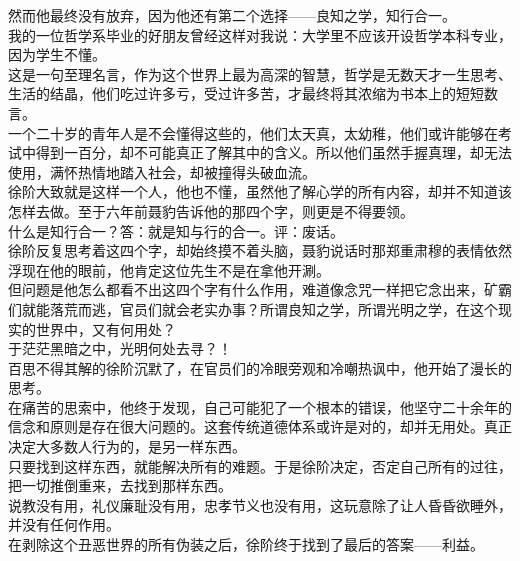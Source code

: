 \begin{multicols}{\theparacolNo}
然而他最终没有放弃，因为他还有第二个选择——良知之学，知行合一。\\

我的一位哲学系毕业的好朋友曾经这样对我说：大学里不应该开设哲学本科专业，因为学生不懂。\\

这是一句至理名言，作为这个世界上最为高深的智慧，哲学是无数天才一生思考、生活的结晶，他们吃过许多亏，受过许多苦，才最终将其浓缩为书本上的短短数言。\\

一个二十岁的青年人是不会懂得这些的，他们太天真，太幼稚，他们或许能够在考试中得到一百分，却不可能真正了解其中的含义。所以他们虽然手握真理，却无法使用，满怀热情地踏入社会，却被撞得头破血流。\\

徐阶大致就是这样一个人，他也不懂，虽然他了解心学的所有内容，却并不知道该怎样去做。至于六年前聂豹告诉他的那四个字，则更是不得要领。\\

什么是知行合一？答：就是知与行的合一。评：废话。\\

徐阶反复思考着这四个字，却始终摸不着头脑，聂豹说话时那郑重肃穆的表情依然浮现在他的眼前，他肯定这位先生不是在拿他开涮。\\

但问题是他怎么都看不出这四个字有什么作用，难道像念咒一样把它念出来，矿霸们就能落荒而逃，官员们就会老实办事？所谓良知之学，所谓光明之学，在这个现实的世界中，又有何用处？\\

于茫茫黑暗之中，光明何处去寻？！\\

百思不得其解的徐阶沉默了，在官员们的冷眼旁观和冷嘲热讽中，他开始了漫长的思考。\\

在痛苦的思索中，他终于发现，自己可能犯了一个根本的错误，他坚守二十余年的信念和原则是存在很大问题的。这套传统道德体系或许是对的，却并无用处。真正决定大多数人行为的，是另一样东西。\\

只要找到这样东西，就能解决所有的难题。于是徐阶决定，否定自己所有的过往，把一切推倒重来，去找到那样东西。\\

说教没有用，礼仪廉耻没有用，忠孝节义也没有用，这玩意除了让人昏昏欲睡外，并没有任何作用。\\

在剥除这个丑恶世界的所有伪装之后，徐阶终于找到了最后的答案——利益。\\


\end{multicols}
